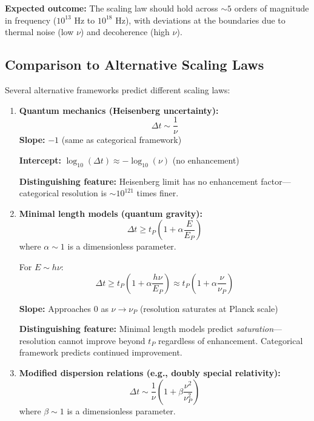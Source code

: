 \documentclass[twocolumn,10pt]{article}
\theoremstyle{remark}
\begin{document}
\textbf{Expected outcome:} The scaling law should hold across $\sim 5$ orders of magnitude in frequency ($10^{13}$ Hz to $10^{18}$ Hz), with deviations at the boundaries due to thermal noise (low $\nu$) and decoherence (high $\nu$).

\subsection{Comparison to Alternative Scaling Laws}

Several alternative frameworks predict different scaling laws:

\begin{enumerate}
    \item \textbf{Quantum mechanics (Heisenberg uncertainty):}
    \begin{equation}
        \Delta t \sim \frac{1}{\nu}
        \label{eq:heisenberg_scaling}
    \end{equation}
    \textbf{Slope:} $-1$ (same as categorical framework)

    \textbf{Intercept:} $\log_{10}(\Delta t) \approx -\log_{10}(\nu)$ (no enhancement)

    \textbf{Distinguishing feature:} Heisenberg limit has no enhancement factor—categorical resolution is $\sim 10^{121}$ times finer.

    \item \textbf{Minimal length models (quantum gravity):}
    \begin{equation}
        \Delta t \geq t_P \left(1 + \alpha \frac{E}{E_P}\right)
        \label{eq:minimal_length_scaling}
    \end{equation}
    where $\alpha \sim 1$ is a dimensionless parameter.

    For $E \sim h\nu$:
    \begin{equation}
        \Delta t \geq t_P \left(1 + \alpha \frac{h\nu}{E_P}\right) \approx t_P \left(1 + \alpha \frac{\nu}{\nu_P}\right)
        \label{eq:minimal_length_frequency}
    \end{equation}

    \textbf{Slope:} Approaches $0$ as $\nu \to \nu_P$ (resolution saturates at Planck scale)

    \textbf{Distinguishing feature:} Minimal length models predict \textit{saturation}—resolution cannot improve beyond $t_P$ regardless of enhancement. Categorical framework predicts continued improvement.

    \item \textbf{Modified dispersion relations (e.g., doubly special relativity):}
    \begin{equation}
        \Delta t \sim \frac{1}{\nu} \left(1 + \beta \frac{\nu^2}{\nu_P^2}\right)
        \label{eq:modified_dispersion}
    \end{equation}
    where $\beta \sim 1$ is a dimensionless parameter.


\end{enumerate}
\end{document}
